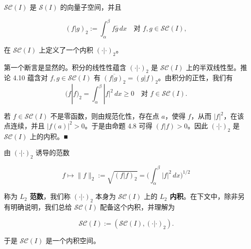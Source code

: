 \begin{proposition}

$ \mathcal{SC}(I) $ 是 $ \mathcal{S}(I) $ 的向量子空间，并且

\[
(f|g)_{2} := \int_{\alpha}^{\beta} f\bar{g} \, dx \quad \text{对 } f, g \in \mathcal{SC}(I) ,
\]

在 $ \mathcal{SC}(I) $ 上定义了一个内积 $ (\cdot|\cdot)_{2} $。

\proofhead
第一个断言是显然的。积分的线性性蕴含 $ (\cdot|\cdot)_{2} $ 是 $ \mathcal{SC}(I) $ 上的半双线性型。推论 4.10 蕴含对 $ f, g \in \mathcal{SC}(I) $ 有 $ \overline{(f|g)_{2}} = (g|f)_{2} $。由积分的正性，我们有
\[
(f|f)_{2} = \int_{\alpha}^{\beta} |f|^{2} \, dx \ge 0 \quad \text{对 } f \in \mathcal{SC}(I) .
\]

若 $ f \in \mathcal{SC}(I) $ 不是零函数，则由规范化性，存在点 $ a $，使得 $ f $，从而 $ |f|^{2} $，在该点连续，并且 $ |f(a)|^{2} > 0 $。于是由命题 4.8 可得 $ (f|f) > 0 $。因此 $ (\cdot|\cdot)_{2} $ 是 $ \mathcal{SC}(I) $ 上的内积。\nobreak\hspace{0.35em}■

\end{proposition}

由 $ (\cdot|\cdot)_{2} $ 诱导的范数

\[
f \mapsto \|f\|_{2} := \sqrt{(f|f)_{2}} = \Big(\int_{\alpha}^{\beta}|f|^{2} \, dx\Big)^{1/2}
\]

称为 \textbf{$ L_{2} $ 范数}，我们称 $ (\cdot|\cdot)_{2} $ 本身为 $ \mathcal{SC}(I) $ 上的 \textbf{$ L_{2} $ 内积}。在下文中，除非另有明确说明，我们总给 $ \mathcal{SC}(I) $ 配备这个内积，并理解为

\[
\mathcal{SC}(I) := (\mathcal{SC}(I), (\cdot|\cdot)_{2}) .
\]

于是 $ \mathcal{SC}(I) $ 是一个内积空间。

